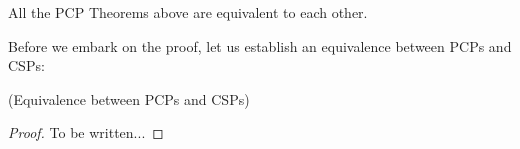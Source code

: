 \begin{theorem}
  All the PCP Theorems above are equivalent to each other.
\end{theorem}

Before we embark on the proof, let us establish an equivalence between PCPs and CSPs:

\begin{lemma} (Equivalence between PCPs and CSPs)

\end{lemma}

\begin{proof}
  To be written...
\end{proof}



